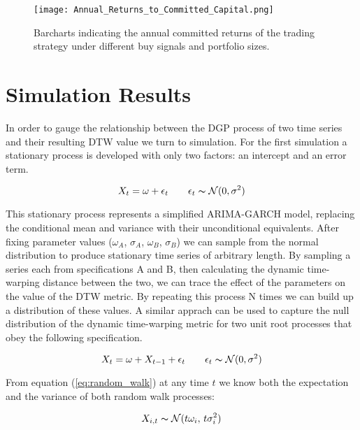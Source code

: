 \documentclass[12pt]{article}
\begin{document}
\begin{landscape}
    \begin{figure}[hp]
        \texttt{[image: Annual\_Returns\_to\_Committed\_Capital.png]}
        \caption{Barcharts indicating the annual committed returns of the trading strategy under different buy signals and portfolio sizes.}
        \label{fig:annual_returns_to_committed_capital_by_buy_signal}
    \end{figure}
\end{landscape}

\section{Simulation Results}
In order to gauge the relationship between the DGP process of two time series and their resulting DTW value we turn to simulation. For the first simulation a stationary process is developed with only two factors: an intercept and an error term.

\begin{equation}
    X_{t} = \omega + \epsilon_{t} \qquad \epsilon_{t} \thicksim \mathcal{N}(0, \sigma^{2})
\end{equation}

This stationary process represents a simplified ARIMA-GARCH model, replacing the conditional mean and variance with their unconditional equivalents. After fixing parameter values ($\omega_{A}$, $\sigma_{A}$, $\omega_{B}$, $\sigma_{B}$) we can sample from the normal distribution to produce stationary time series of arbitrary length. By sampling a series each from specifications A and B, then calculating the dynamic time-warping distance between the two, we can trace the effect of the parameters on the value of the DTW metric. By repeating this process N times we can build up a distribution of these values. A similar apprach can be used to capture the null distribution of the dynamic time-warping metric for two unit root processes that obey the following specification.

\begin{equation} \label{eq:random_walk}
    X_{t} = \omega + X_{t-1} + \epsilon_{t} \qquad \epsilon_{t} \thicksim \mathcal{N}(0, \sigma^{2})
\end{equation}

From equation (\ref{eq:random_walk}) at any time $t$ we know both the expectation and the variance of both random walk processes:

\begin{equation}
    X_{i,t} \thicksim \mathcal{N}(t\omega_{i}, \, t\sigma_{i}^{2})
\end{equation}
\end{document}
